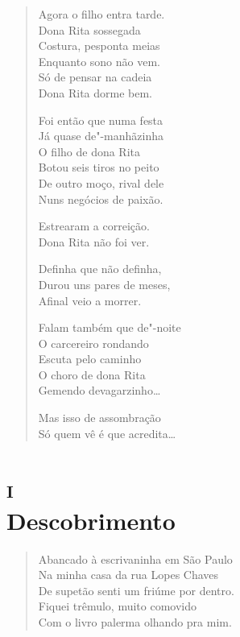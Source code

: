 {\begin{verse}
Agora o filho entra tarde.\\
Dona Rita sossegada\\
Costura, pesponta meias\\
Enquanto sono não vem.\\
Só de pensar na cadeia\\
Dona Rita dorme bem.

Foi então que numa festa\\
Já quase de"-manhãzinha\\
O filho de dona Rita\\
Botou seis tiros no peito\\
De outro moço, rival dele\\
Nuns negócios de paixão.

Estrearam a correição.\\
Dona Rita não foi ver.

Definha que não definha,\\
Durou uns pares de meses,\\
Afinal veio a morrer.

Falam também que de"-noite\\
O carcereiro rondando\\
Escuta pelo caminho\\
O choro de dona Rita\\
Gemendo devagarzinho\ldots{}

Mas isso de assombração\\
Só quem vê é que acredita\ldots{}
\end{verse}

\chapter[Descobrimento]{\textsc{i}\\Descobrimento}



\begin{verse}
Abancado à escrivaninha em São Paulo\\
Na minha casa da rua Lopes Chaves\\
De supetão senti um friúme por dentro.\\
Fiquei trêmulo, muito comovido\\
Com o livro palerma olhando pra mim.


\end{verse}}
